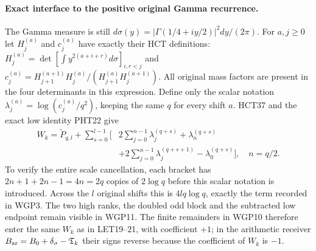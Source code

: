 \documentclass[11pt,a4paper]{article}
\begin{document}
\paragraph{Exact interface to the positive original Gamma recurrence.}
The Gamma measure is still
$d\sigma(y)=|\Gamma(1/4+iy/2)|^2dy/(2\pi)$.
For $a,j\ge0$ let $H_j^{(a)}$ and $c_j^{(a)}$ have exactly their
HCT definitions: $H_j^{(a)}=\det[\int y^{2(a+i+r)}d\sigma]_{i,r<j}$
and $c_j^{(a)}=H_{j+1}^{(a+1)}H_j^{(a)}/
(H_{j+1}^{(a)}H_j^{(a+1)})$. All original mass factors are present
in the four determinants in this expression. Define only the scalar
notation $\lambda_j^{(a)}=\log(c_j^{(a)}/q^2)$, keeping the same $q$
for every shift $a$. HCT37 and the exact low identity PHT22 give
\[
 \boxed{\begin{aligned}
 W_k=\widetilde P_{q,l}+\sum_{s=0}^{l-1}\bigg[
  &2\sum_{j=0}^{n-1}\lambda_j^{(q+s)}+\lambda_n^{(q+s)}\\
  &+2\sum_{j=0}^{n-1}\lambda_j^{(q+s+1)}
       -\lambda_0^{(q+s)}\bigg],\quad n=q/2.
 \end{aligned}}\tag{WGP11}
\]
To verify the entire scale cancellation, each bracket has
$2n+1+2n-1=4n=2q$ copies of $2\log q$ before this scalar
notation is introduced. Across the $l$ original shifts this is
$4lq\log q$, exactly the term recorded in WGP3. The two high ranks,
the doubled odd block and the subtracted low endpoint remain visible
in WGP11. The finite remainders in WGP10 therefore enter the same
$W_k$ as in LET19--21, with coefficient $+1$; in the arithmetic
receiver $B_{\rm ar}=B_0+\delta_\sigma-\mathfrak T_k$ their signs
reverse because the coefficient of $W_k$ is $-1$.
\end{document}
